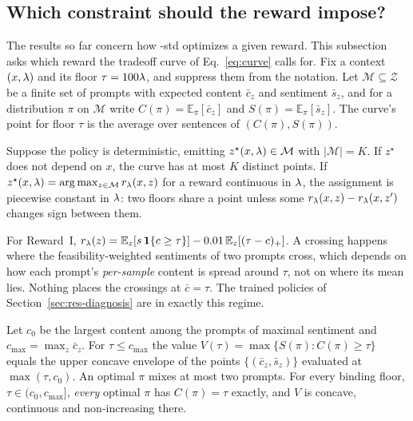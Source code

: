 \subsection{Which constraint should the reward impose?}
\label{sec:th-constraint}

The results so far concern how \rrebel{}-std optimizes a given reward. This
subsection asks which reward the tradeoff curve of Eq.~\eqref{eq:curve}
calls for. Fix a context $(x,\lambda)$ and its floor $\tau = 100\lambda$, and
suppress them from the notation. Let $\mathcal{M} \subseteq \mathcal{Z}$ be a
finite set of prompts with expected content $\bar c_z$ and sentiment $\bar s_z$,
and for a distribution $\pi$ on $\mathcal{M}$ write
$C(\pi) = \mathbb{E}_\pi[\bar c_z]$ and $S(\pi) = \mathbb{E}_\pi[\bar s_z]$.
The curve's point for floor $\tau$ is the average over sentences of
$(C(\pi), S(\pi))$.

\begin{lemma}
\label{lem:cluster}
Suppose the policy is deterministic, emitting $z^\star(x,\lambda) \in \mathcal{M}$
with $|\mathcal{M}| = K$. If $z^\star$ does not depend on $x$, the curve has at
most $K$ distinct points. If $z^\star(x,\lambda) = \arg\max_{z\in\mathcal{M}}
r_\lambda(x,z)$ for a reward continuous in $\lambda$, the assignment is piecewise
constant in $\lambda$: two floors share a point unless some
$r_\lambda(x,z) - r_\lambda(x,z')$ changes sign between them.
\end{lemma}

For Reward~I, $r_\lambda(z) = \mathbb{E}_z[s\,\mathbf{1}\{c\ge\tau\}] -
0.01\,\mathbb{E}_z[(\tau - c)_+]$. A crossing happens where the
feasibility-weighted sentiments of two prompts cross, which depends on how each
prompt's \emph{per-sample} content is spread around $\tau$, not on where its
mean lies. Nothing places the crossings at $\bar c = \tau$. The trained
policies of Section~\ref{sec:res-diagnosis} are in exactly this regime.

\begin{proposition}
\label{prop:eps}
Let $c_0$ be the largest content among the prompts of maximal sentiment and
$c_{\max} = \max_z \bar c_z$. For $\tau \le c_{\max}$ the value
$V(\tau) = \max\{S(\pi) : C(\pi) \ge \tau\}$ equals the upper concave envelope
of the points $\{(\bar c_z, \bar s_z)\}$ evaluated at $\max(\tau, c_0)$. An
optimal $\pi$ mixes at most two prompts. For every binding floor,
$\tau \in (c_0, c_{\max}]$, \emph{every} optimal $\pi$ has $C(\pi) = \tau$
exactly, and $V$ is concave, continuous and non-increasing there.
\end{proposition}

